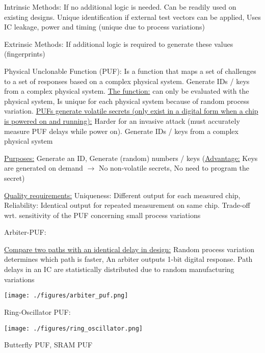 \documentclass[landscape, a4paper]{article}
\begin{document}
\begin{minipage}[t]{0.2\linewidth}
\begin{betterlist}
\begin{betterlist}
\begin{betterlist}
				\begin{betterlist}
					\item \alert{Intrinsic Methods:} If no additional logic is needed. Can be readily used on existing designs. Unique identification if external test vectors can be applied, Uses IC leakage, power and timing (unique due to process variations)%
					\item \alert{Extrinsic Methods:} If additional logic is required to generate these values (fingerprints)
					\begin{betterlist}
						\item \alert{Physical Unclonable Function (PUF):} Is a function that maps a set of challenges to a set of responses based on a complex physical system.  Generate IDs / keys from a complex physical system. \underline{The function:} can only be evaluated with the physical system, Is unique for each physical system because of random process variation. \uline{PUFs generate volatile secrets (only exist in a digital form when a chip is powered on and running):} Harder for an invasive attack (must accurately measure PUF delays while power on). Generate IDs / keys from a complex physical system
						\item \underline{Purposes:} Generate an ID, Generate (random) numbers / keys (\underline{Advantage:} Keys are generated on demand $\rightarrow$ No non-volatile secrets, No need to program the secret)
						\item \underline{Quality requirements:} \alert{Uniqueness:} Different output for each measured chip, \alert{Reliability:} Identical output for repeated measurement on same chip. \alert{Trade-off} wrt. sensitivity of the PUF concerning small process variations
						\item \alert{Arbiter-PUF:}
						\begin{betterlist}
							\item \uline{Compare two paths with an identical delay in design:} Random process variation determines which path is faster, An arbiter outputs 1-bit digital response. Path delays in an IC are statistically distributed due to random manufacturing variations
						\end{betterlist}

						\texttt{[image: ./figures/arbiter\_puf.png]}
						\item \alert{Ring-Oscillator PUF:}

						\texttt{[image: ./figures/ring\_oscillator.png]}
						\item \alert{Butterfly PUF}, \alert{SRAM PUF}
					\end{betterlist}
				\end{betterlist}
			\end{betterlist}
		\end{betterlist}
	\end{betterlist}
\end{minipage}
\end{document}
